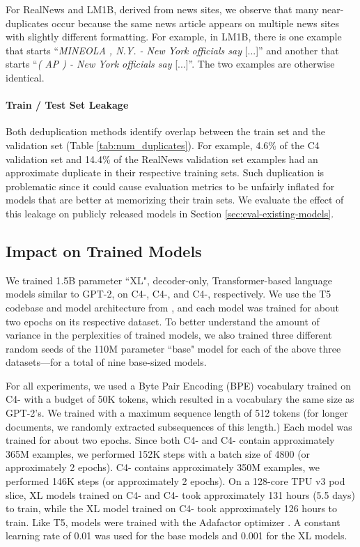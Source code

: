 For RealNews and LM1B, derived from news sites, we observe that many near-duplicates occur because the same news article appears on multiple news sites with slightly different formatting.
For example, in LM1B, there is one example that starts ``\textit{MINEOLA , N.Y. - New York officials say} [...]'' and another that starts ``\textit{( AP ) - New York officials say} [...]''.
The two examples are otherwise identical.

\paragraph{Train / Test Set Leakage}
\label{sec:leakage}
Both deduplication methods identify overlap between the train set and the validation set (Table \ref{tab:num_duplicates}).
For example, 4.6\% of the C4 validation set and 14.4\% of the RealNews validation set examples had an approximate duplicate in their respective training sets.
Such duplication is problematic since it could cause evaluation metrics to be unfairly inflated for models that are better at memorizing their train sets.
We evaluate the effect of this leakage on publicly released models in Section \ref{sec:eval-existing-models}.

\subsection{Impact on Trained Models}
\label{sec:impact-trained-models}
We trained 1.5B parameter ``XL", decoder-only, Transformer-based language models similar to GPT-2, on C4-\Original, C4-\Approx, and C4-\Exact, respectively.
We use the T5 codebase and model architecture from \citet{raffel2019exploring}, and each model was trained for about two epochs on its respective dataset.
To better understand the amount of variance in the perplexities of trained models, we also trained three different random seeds of the 110M parameter ``base" model for each of the above three datasets---for a total of nine base-sized models.

For all experiments, we used a Byte Pair Encoding (BPE) vocabulary trained on C4-\Approx{} with a budget of 50K tokens, which resulted in a vocabulary the same size as GPT-2's.
We trained with a maximum sequence length of 512 tokens (for longer documents, we randomly extracted subsequences of this length.)
Each model was trained for about two epochs.
Since both C4-\Original{} and C4-\Exact{} contain approximately 365M examples, we performed 152K steps with a batch size of 4800 (or approximately 2 epochs). 
C4-\Approx{} contains approximately 350M examples, we performed 146K steps (or approximately 2 epochs).
On a 128-core TPU v3 pod slice, XL models trained on C4-\Original{} and C4-\Exact{} took approximately 131 hours (5.5 days) to train, while the XL model trained on C4-\Approx{} took approximately 126 hours to train.
Like T5, models were trained with the Adafactor optimizer \citep{shazeer2018adafactor}. A constant learning rate of 0.01 was used for the base models and 0.001 for the XL models.

